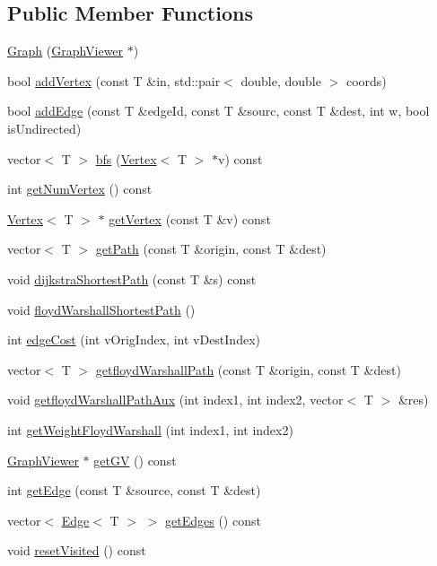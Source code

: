 \subsection*{Public Member Functions}
\begin{DoxyCompactItemize}
\item 
\hyperlink{classGraph_acda25b82a1565955306b44ae01660349}{Graph} (\hyperlink{classGraphViewer}{Graph\+Viewer} $\ast$)
\item 
bool \hyperlink{classGraph_a18f099535183b37aef90bb55f4669e65}{add\+Vertex} (const T \&in, std\+::pair$<$ double, double $>$ coords)
\item 
bool \hyperlink{classGraph_a00dea5cb57b90bb1836040145c4dfb0a}{add\+Edge} (const T \&edge\+Id, const T \&sourc, const T \&dest, int w, bool is\+Undirected)
\item 
vector$<$ T $>$ \hyperlink{classGraph_a0e9598b98be2570eb432690411a577e8}{bfs} (\hyperlink{classVertex}{Vertex}$<$ T $>$ $\ast$v) const 
\item 
int \hyperlink{classGraph_a295932f117d92c825a97ec458e0fb332}{get\+Num\+Vertex} () const 
\item 
\hyperlink{classVertex}{Vertex}$<$ T $>$ $\ast$ \hyperlink{classGraph_a08a95472b0d9bd7321660940807af060}{get\+Vertex} (const T \&v) const 
\item 
vector$<$ T $>$ \hyperlink{classGraph_ab4054ca572c10669dd3e05d6d41c116c}{get\+Path} (const T \&origin, const T \&dest)
\item 
void \hyperlink{classGraph_a3631bce147c033119e2d328848effd43}{dijkstra\+Shortest\+Path} (const T \&s) const 
\item 
void \hyperlink{classGraph_ae5161f4408bf1ead2b29d19d67fb04ee}{floyd\+Warshall\+Shortest\+Path} ()
\item 
int \hyperlink{classGraph_a7e137f1ef838395ac1044a944fa54448}{edge\+Cost} (int v\+Orig\+Index, int v\+Dest\+Index)
\item 
vector$<$ T $>$ \hyperlink{classGraph_ab23d1dae92a7f2b29dcb91a94336674c}{getfloyd\+Warshall\+Path} (const T \&origin, const T \&dest)
\item 
void \hyperlink{classGraph_aad1eda4beb8425d03ed1f3b8af397563}{getfloyd\+Warshall\+Path\+Aux} (int index1, int index2, vector$<$ T $>$ \&res)
\item 
int \hyperlink{classGraph_ab314d60da32e5e0080e51c9c17f06f85}{get\+Weight\+Floyd\+Warshall} (int index1, int index2)
\item 
\hyperlink{classGraphViewer}{Graph\+Viewer} $\ast$ \hyperlink{classGraph_a8cfc98c097359592094c27f2118dc6a7}{get\+GV} () const 
\item 
int \hyperlink{classGraph_ac9ce9fbd0d125874296f2df5731e1a72}{get\+Edge} (const T \&source, const T \&dest)
\item 
vector$<$ \hyperlink{classEdge}{Edge}$<$ T $>$ $>$ \hyperlink{classGraph_aa46616d7684e3f3e69cb0d5497a8b45e}{get\+Edges} () const 
\item 
void \hyperlink{classGraph_a3c32b686c689011a360e7e25a76ee511}{reset\+Visited} () const 
\end{DoxyCompactItemize}

